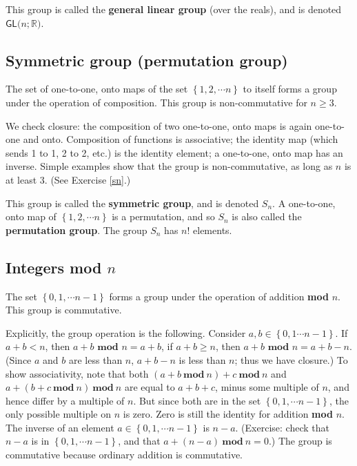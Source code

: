 \documentclass[12pt]{amsbook}
\theoremstyle{plain}
\numberwithin{equation}{chapter}
\numberwithin{theorem}{chapter}
\begin{document}
This group is called the \textbf{general linear group} (over the reals), and
is denoted $\mathsf{GL}(n;\mathbb{R}\mathbf{)}$.

\subsection{Symmetric group (permutation group)}

The set of one-to-one, onto maps of the set $\left\{  1,2,\cdots n\right\}  $
to itself forms a group under the operation of composition. This group is
non-commutative for $n\geq3$.

We check closure: the composition of two one-to-one, onto maps is again
one-to-one and onto. Composition of functions is associative; the identity map
(which sends 1 to 1, 2 to 2, etc.) is the identity element; a one-to-one, onto
map has an inverse. Simple examples show that the group is non-commutative, as
long as $n$ is at least 3. (See Exercise \ref{sn}.)

This group is called the \textbf{symmetric group}, and is denoted $S_{n}$. A
one-to-one, onto map of $\left\{  1,2,\cdots n\right\}  $ is a permutation,
and so $S_{n}$ is also called the \textbf{permutation group}. The group
$S_{n}$ has $n!$ elements.

\subsection{Integers \textbf{mod} $n$}

The set $\left\{  0,1,\cdots n-1\right\}  $ forms a group under the operation
of addition \textbf{mod }$n$. This group is commutative.

Explicitly, the group operation is the following. Consider $a,b\in\left\{
0,1\cdots n-1\right\}  $. If $a+b<n$, then $a+b$ $\mathbf{mod}$ $n=a+b$, if
$a+b\geq n$, then $a+b$ $\mathbf{mod}$ $n=a+b-n$. (Since $a$ and $b$ are less
than $n$, $a+b-n$ is less than $n$; thus we have closure.) To show
associativity, note that both $(a+b\ \mathbf{mod}\ n)+c\ \mathbf{mod}\ n$ and
$a+(b+c\ \mathbf{mod}\ n)\ \mathbf{mod}\ n$ are equal to $a+b+c$, minus some
multiple of $n$, and hence differ by a multiple of $n$. But since both are in
the set $\left\{  0,1,\cdots n-1\right\}  $, the only possible multiple on $n$
is zero. Zero is still the identity for addition \textbf{mod} $n$. The inverse
of an element $a\in\left\{  0,1,\cdots n-1\right\}  $ is $n-a$. (Exercise:
check that $n-a$ is in $\left\{  0,1,\cdots n-1\right\}  $, and that
$a+(n-a)\ \mathbf{mod}\ n=0$.) The group is commutative because ordinary
addition is commutative.
\end{document}
